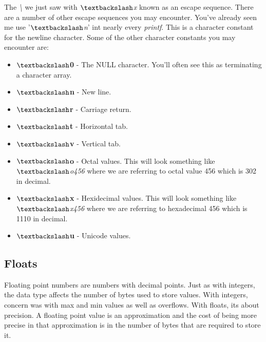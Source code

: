\documentclass[../main.tex]{subfiles}
\begin{document}
	The \textit{\textbackslash} we just saw with \textit{$\textbackslash$x} known as an escape sequence.  There are a number of other escape sequences you may encounter.  You've already seen me use '\textit{$\textbackslash$n}' int nearly every \textit{printf}.  This is a character constant for the newline character.  Some of the other character constants you may encounter are:
	\begin{itemize}
		\item \textbf{$\textbackslash$0}	- The NULL character.  You'll often see this as terminating a character array.
		\item \textbf{$\textbackslash$n}	- New line.
		\item \textbf{$\textbackslash$r}	- Carriage return.
		\item \textbf{$\textbackslash$t} 	- Horizontal tab.
		\item \textbf{$\textbackslash$v}	- Vertical tab.
		\item \textbf{$\textbackslash$o}	- Octal values.  This will look something like \textit{$\textbackslash$o456} where we are referring to octal value 456 which is 302 in decimal.
		\item \textbf{$\textbackslash$x}	- Hexidecimal values.  This will look something like \textit{$\textbackslash$x456} where we are referring to hexadecimal 456 which is 1110 in decimal.
		\item \textbf{$\textbackslash$u}	- Unicode values.	
	\end{itemize}

	
	\subsection{Floats}
	
	Floating point numbers are numbers with decimal points.  Just as with integers, the data type affects the number of bytes used to store values.  With integers, concern was with max and min values as well as overflows.  With floats, its about precision.  A floating point value is an approximation and the cost of being more precise in that approximation is in the number of bytes that are required to store it.
	
\end{document}
